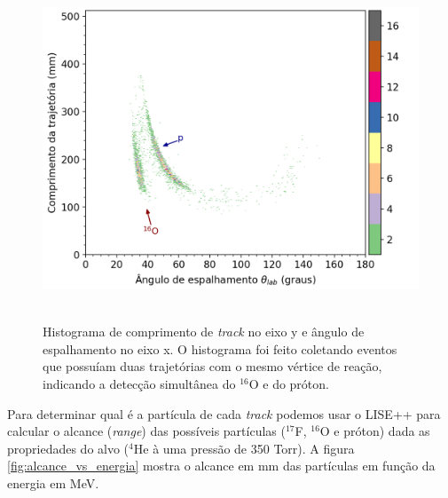\documentclass[a4paper,12pt,oneside]{book}
\begin{document}
\begin{figure}[H]
    \centering
    \includegraphics[scale = 0.75]{figs/coincidencias_tpc.png}\
    \caption{Histograma de comprimento de \textit{track} no eixo y e ângulo de espalhamento no eixo x. O histograma foi feito coletando eventos que possuíam duas trajetórias com o mesmo vértice de reação, indicando a detecção simultânea do $^{16}$O e do próton.}
    \label{fig:coincidencia_detec}
\end{figure}

\par Para determinar qual é a partícula de cada \textit{track} podemos usar o LISE++\cite{lise++} para calcular o alcance (\textit{range}) das possíveis partículas ($^{17}$F, $^{16}$O e próton) dada as propriedades do alvo ($^4$He à uma pressão de 350 Torr). A figura \ref{fig:alcance_vs_energia} mostra o alcance em mm das partículas em função da energia em MeV.



\par 

%     
\end{document}
